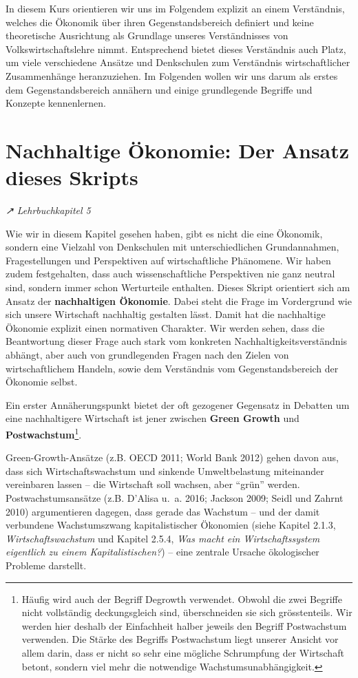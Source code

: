 \documentclass[
  nswissgerman,
  a4paper,
  DIV=11,
  numbers=noendperiod,
  oneside,
  openany]{scrreprt}
\begin{document}
In diesem Kurs orientieren wir uns im Folgendem explizit an einem
Verständnis, welches die Ökonomik über ihren Gegenstandsbereich
definiert und keine theoretische Ausrichtung als Grundlage unseres
Verständnisses von Volkswirtschaftslehre nimmt. Entsprechend bietet
dieses Verständnis auch Platz, um viele verschiedene Ansätze und
Denkschulen zum Verständnis wirtschaftlicher Zusammenhänge
heranzuziehen. Im Folgenden wollen wir uns darum als erstes dem
Gegenstandsbereich annähern und einige grundlegende Begriffe und
Konzepte kennenlernen.

\section{Nachhaltige Ökonomie: Der Ansatz dieses
Skripts}\label{nachhaltige-uxf6konomie-der-ansatz-dieses-skripts}

\emph{↗ Lehrbuchkapitel 5}

Wie wir in diesem Kapitel gesehen haben, gibt es nicht die eine
Ökonomik, sondern eine Vielzahl von Denkschulen mit unterschiedlichen
Grundannahmen, Fragestellungen und Perspektiven auf wirtschaftliche
Phänomene. Wir haben zudem festgehalten, dass auch wissenschaftliche
Perspektiven nie ganz neutral sind, sondern immer schon Werturteile
enthalten. Dieses Skript orientiert sich am Ansatz der
\textbf{nachhaltigen Ökonomie}. Dabei steht die Frage im Vordergrund wie
sich unsere Wirtschaft nachhaltig gestalten lässt. Damit hat die
nachhaltige Ökonomie explizit einen normativen Charakter. Wir werden
sehen, dass die Beantwortung dieser Frage auch stark vom konkreten
Nachhaltigkeitsverständnis abhängt, aber auch von grundlegenden Fragen
nach den Zielen von wirtschaftlichem Handeln, sowie dem Verständnis vom
Gegenstandsbereich der Ökonomie selbst.

Ein erster Annäherungspunkt bietet der oft gezogener Gegensatz in
Debatten um eine nachhaltigere Wirtschaft ist jener zwischen
\textbf{Green Growth} und \textbf{Postwachstum}\footnote{Häufig wird
  auch der Begriff Degrowth verwendet. Obwohl die zwei Begriffe nicht
  vollständig deckungsgleich sind, überschneiden sie sich grösstenteils.
  Wir werden hier deshalb der Einfachheit halber jeweils den Begriff
  Postwachstum verwenden. Die Stärke des Begriffs Postwachstum liegt
  unserer Ansicht vor allem darin, dass er nicht so sehr eine mögliche
  Schrumpfung der Wirtschaft betont, sondern viel mehr die notwendige
  Wachstumsunabhängigkeit.}.

Green-Growth-Ansätze (z.B. OECD 2011; World Bank 2012) gehen davon aus,
dass sich Wirtschaftswachstum und sinkende Umweltbelastung miteinander
vereinbaren lassen -- die Wirtschaft soll wachsen, aber ``grün'' werden.
Postwachstumsansätze (z.B. D'Alisa u.~a. 2016; Jackson 2009; Seidl und
Zahrnt 2010) argumentieren dagegen, dass gerade das Wachstum -- und der
damit verbundene Wachstumszwang kapitalistischer Ökonomien (siehe
Kapitel 2.1.3, \emph{Wirtschaftswachstum} und Kapitel 2.5.4, \emph{Was
macht ein Wirtschaftssystem eigentlich zu einem Kapitalistischen?}) --
eine zentrale Ursache ökologischer Probleme darstellt.
\end{document}
